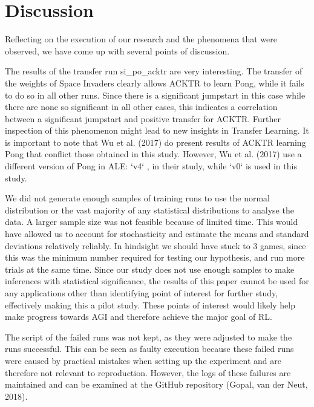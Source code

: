\section{Discussion}
Reflecting on the execution of our research and the phenomena that were observed, we have come up with several points of discussion. 

The results of the transfer run si\_po\_acktr are very interesting. The transfer of the weights of Space Invaders clearly allows ACKTR to learn Pong, while it fails to do so in all other runs. Since there is a significant jumpstart in this case while there are none so significant in all other cases, this indicates a correlation between a significant jumpstart and positive transfer for ACKTR. Further inspection of this phenomenon might lead to new insights in Transfer Learning. It is important to note that Wu et al. (2017) do present results of ACKTR learning Pong that conflict those obtained in this study. However, Wu et al. (2017) use a different version of Pong in ALE: `v4` , in their study, while `v0` is used in this study. 

We did not generate enough samples of training runs to use the normal distribution or the vast majority of any statistical distributions to analyse the data. A larger sample size was not feasible because of limited time. This would have allowed us to account for stochasticity and estimate the means and standard deviations relatively reliably. In hindsight we should have stuck to 3 games, since this was the minimum number required for testing our hypothesis, and run more trials at the same time. Since our study does not use enough samples to make inferences with statistical significance, the results of this paper cannot be used for any applications other than identifying point of interest for further study, effectively making this a pilot study. These points of interest would likely help make progress towards AGI and therefore achieve the major goal of RL.

The script of the failed runs was not kept, as they were adjusted to make the runs successful. This can be seen as faulty execution because these failed runs were caused by practical mistakes when setting up the experiment and are therefore not relevant to reproduction. However, the logs of these failures are maintained and can be examined at the GitHub repository (Gopal, van der Neut, 2018).

